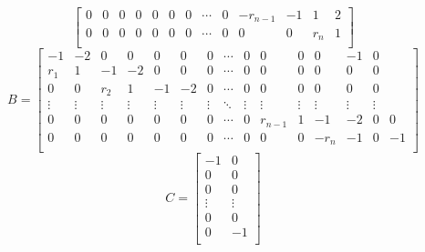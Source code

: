 \begin{mdframed}[style=zkprotocolwithheader, frametitle=Adding ZK to sumcheck]
\begin{enumerate}
\begin{equation*}
\begin{bmatrix}
                0 & 0 & 0 & 0 & 0 & 0 & 0 & \cdots & 0 & -r_{n-1} & -1 & 1 & 2 \\
                0 & 0 & 0 & 0 & 0 & 0 & 0 & \cdots & 0 & 0 & 0 & r_n & 1 \\
            \end{bmatrix}
        \end{equation*}
        \begin{equation*}
            B = 
            \begin{bmatrix}
                -1 & -2 & 0 & 0 & 0 & 0 & 0 & \cdots & 0 & 0 & 0 & 0 & -1 & 0 \\
                r_1 & 1 & -1 & -2 & 0 & 0 & 0 & \cdots & 0 & 0 & 0 & 0 & 0 & 0 \\
                0 & 0 & r_2 & 1 & -1 & -2 & 0 & \cdots & 0 & 0 & 0 & 0 & 0 & 0\\
                \vdots & \vdots & \vdots & \vdots & \vdots & \vdots & \vdots & \ddots & \vdots & \vdots & \vdots & \vdots & \vdots & \vdots \\
                0 & 0 & 0 & 0 & 0 & 0 & 0 & \cdots & 0 & r_{n-1} & 1 & -1 & -2 & 0 & 0\\
                0 & 0 & 0 & 0 & 0 & 0 & 0 & \cdots & 0 & 0 & 0 & -r_n & -1 & 0 & -1\\
            \end{bmatrix}
        \end{equation*}
        \begin{equation*}
            C = 
            \begin{bmatrix}
                -1 & 0 \\
                0 & 0 \\
                0 & 0\\
                \vdots & \vdots \\
                0 & 0\\
                0 & -1\\
            \end{bmatrix}
        \end{equation*}


\end{enumerate}
\end{mdframed}
